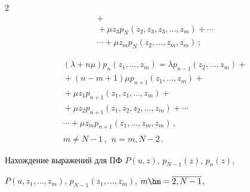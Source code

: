 \begin{multicols}{2}
\begin{multline}
+{}


\\


{}+


\mu z_3 p_{N}\left(z_2,z_3,z_3,\ldots,z_{m}\right) +


\cdots{}\\


{}\cdots + \mu z_m p_{N}\left(z_2,\ldots,z_{m},z_m\right)\,;


\end{multline}





\vspace*{-12pt}





\noindent


\begin{multline}


\label{bat-z-4}


(\lambda+n\mu) p_{n}\left(z_1,\ldots,z_{m}\right)


= \lambda p_{n-1}(z_2,\ldots,z_{m}) +{}\\


{}+


(n-m+1) \mu p_{n+1}\left(z_1,\ldots,z_{m}\right)


+{}


\\


{}+


\mu z_1 p_{n+1}\left(z_1,z_1,\ldots,z_{m}\right)+{}\\


{}+ \mu z_2 p_{n+1}\left(z_1,z_2,z_2,\ldots,z_{m}\right)


+\cdots{}


\\


{} \cdots +


\mu z_m p_{n+1}\left(z_1,\ldots,z_{m},z_m\right)\,,\\ 


m \ne N-1\,, \ \ 


n=\overline{m,N-2}\,.


\end{multline}





Нахождение выражений для ПФ $P(u,z)$, $p_{N-1}(z)$, $p_{n}(z)$, 


$P(u,z_1,\ldots,z_{m})$,  $p_{N-1}(z_1,\ldots,z_{m})$, $m\hm=\overline{2,N-1}$, 



\end{multicols}
